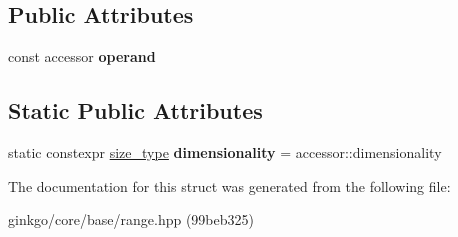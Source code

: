 \subsection*{Public Attributes}
\begin{DoxyCompactItemize}
\item 
\mbox{\label{structgko_1_1accessor_1_1transpose__operation_a2b4c2d5172d31e787f8d4965251743b3}} 
const accessor {\bfseries operand}
\end{DoxyCompactItemize}
\subsection*{Static Public Attributes}
\begin{DoxyCompactItemize}
\item 
\mbox{\label{structgko_1_1accessor_1_1transpose__operation_aee04484bec2b33a04e2482077a5925a5}} 
static constexpr \hyperlink{namespacegko_a6e5c95df0ae4e47aab2f604a22d98ee7}{size\+\_\+type} {\bfseries dimensionality} = accessor\+::dimensionality
\end{DoxyCompactItemize}


The documentation for this struct was generated from the following file\+:\begin{DoxyCompactItemize}
\item 
ginkgo/core/base/range.\+hpp (99beb325)\end{DoxyCompactItemize}
